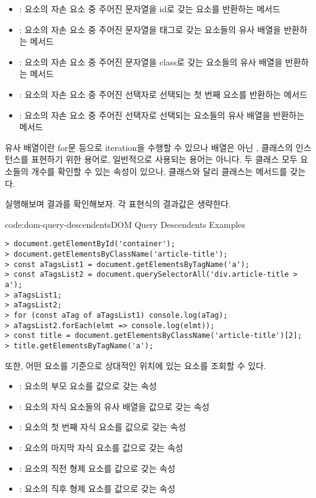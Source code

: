 \begin{itemize}
    \item {}: 요소의 자손 요소 중 주어진 문자열을 id로 갖는 요소를 반환하는 메서드
    \item {}: 요소의 자손 요소 중 주어진 문자열을 태그로 갖는 요소들의 유사 배열을 반환하는 메서드
    \item {}: 요소의 자손 요소 중 주어진 문자열을 class로 갖는 요소들의 유사 배열을 반환하는 메서드
    \item {}: 요소의 자손 요소 중 주어진 선택자로 선택되는 첫 번째 요소를 반환하는 메서드
    \item {}: 요소의 자손 요소 중 주어진 선택자로 선택되는 요소들의 유사 배열을 반환하는 메서드
\end{itemize}

유사 배열이란 for문 등으로 iteration을 수행할 수 있으나 배열은 아닌 ,  클래스의 인스턴스를 표현하기 위한 용어로, 일반적으로 사용되는 용어는 아니다. 두 클래스 모두 요소들의 개수를 확인할 수 있는  속성이 있으나,  클래스와 달리  클래스는  메서드를 갖는다.

\를 실행해보며 결과를 확인해보자. 각 표현식의 결과값은 생략한다.


\begin{codeenv}{code:dom-query-descendents}{DOM Query Descendents Examples}\begin{verbatim}
> document.getElementById('container');
> document.getElementsByClassName('article-title');
> const aTagsList1 = document.getElementsByTagName('a');
> const aTagsList2 = document.querySelectorAll('div.article-title > a');
> aTagsList1;
> aTagsList2;
> for (const aTag of aTagsList1) console.log(aTag);
> aTagsList2.forEach(elmt => console.log(elmt));
> const title = document.getElementsByClassName('article-title')[2];
> title.getElementsByTagName('a');
\end{verbatim}
\end{codeenv}

또한, 어떤 요소를 기준으로 상대적인 위치에 있는 요소를 조회할 수 있다.

\begin{itemize}
    \item {}: 요소의 부모 요소를 값으로 갖는 속성
    \item {}: 요소의 자식 요소들의 유사 배열을 값으로 갖는 속성
    \item {}: 요소의 첫 번째 자식 요소를 값으로 갖는 속성
    \item {}: 요소의 마지막 자식 요소를 값으로 갖는 속성
    \item {}: 요소의 직전 형제 요소를 값으로 갖는 속성
    \item {}: 요소의 직후 형제 요소를 값으로 갖는 속성
\end{itemize}


